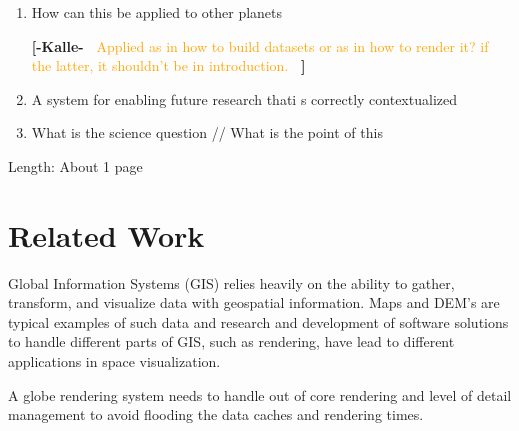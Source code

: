 \documentclass[journal]{vgtc}                %
\newcommand{\kallecomment}[1]{\textbf{[-Kalle-~}
    \textcolor{orange}{#1}
    \textbf{~]}}
\begin{document}
\begin{enumerate}
\kallecomment{Mention latest coordinate system for Mars, IAU/IAG 2000 adoption.. Use of MOLA for correction etc.}

The highest resolution global color mosaic available for Mars today is still composed of images from the Viking missions. The latest version, compiled by NASA AMES, is warped to match the latest grayscale MDIM 2.1 mosaic. 

The Mars Orbiter Laser Altimeter (MOLA) is an instrument on the Mars Global Surveyor (MGS) spacecraft. The digital elevation model (DEM) assembled from MOLA data maps each position on the globe with an offset from the Areoid, Mars' reference ellipsoid, to an average accuracy of +-3 m (ref). The dataset has a resolution of 463.0836 meters/pixel.

\kallecomment{+-3 m sounds too good to be true? Should check the reference.}

\kallecomment{Areoid: geoid but for Mars. Areography, Martian geography.}




\kallecomment{Other datasets? Does ESA have Mars missions of interest?}

\item How can this be applied to other planets

\kallecomment{Applied as in how to build datasets or as in how to render it? if the latter, it shouldn't be in introduction.}

\item A system for enabling future research thati s correctly contextualized
\item What is the science question // What is the point of this
\end{enumerate}
Length: About 1 page

\section{Related Work} \label{sec:relatedwork}

Global Information Systems (GIS) relies heavily on the ability to gather, transform, and visualize data with geospatial information. Maps and DEM's are typical examples of such data and research and development of software solutions to handle different parts of GIS, such as rendering, have lead to different applications in space visualization.

A globe rendering system needs to handle out of core rendering and level of detail management to avoid flooding the data caches and rendering times. 
\end{document}
